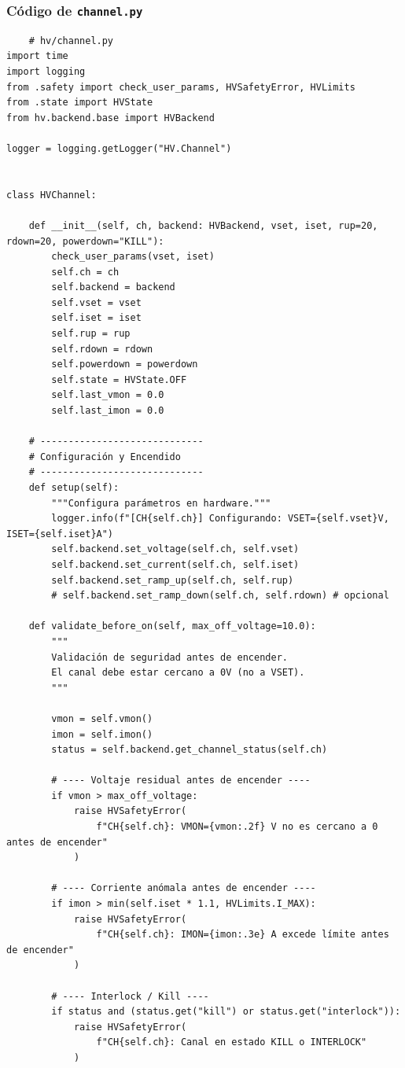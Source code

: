 \documentclass{article}
\begin{document}
\subsubsection{Código de \texttt{channel.py}}
\begin{lstlisting}
    # hv/channel.py
import time
import logging
from .safety import check_user_params, HVSafetyError, HVLimits
from .state import HVState
from hv.backend.base import HVBackend

logger = logging.getLogger("HV.Channel")


class HVChannel:

    def __init__(self, ch, backend: HVBackend, vset, iset, rup=20, rdown=20, powerdown="KILL"):
        check_user_params(vset, iset)
        self.ch = ch
        self.backend = backend
        self.vset = vset
        self.iset = iset
        self.rup = rup
        self.rdown = rdown
        self.powerdown = powerdown
        self.state = HVState.OFF
        self.last_vmon = 0.0
        self.last_imon = 0.0

    # -----------------------------
    # Configuración y Encendido
    # -----------------------------
    def setup(self):
        """Configura parámetros en hardware."""
        logger.info(f"[CH{self.ch}] Configurando: VSET={self.vset}V, ISET={self.iset}A")
        self.backend.set_voltage(self.ch, self.vset)
        self.backend.set_current(self.ch, self.iset)
        self.backend.set_ramp_up(self.ch, self.rup)
        # self.backend.set_ramp_down(self.ch, self.rdown) # opcional

    def validate_before_on(self, max_off_voltage=10.0):
        """
        Validación de seguridad antes de encender.
        El canal debe estar cercano a 0V (no a VSET).
        """

        vmon = self.vmon()
        imon = self.imon()
        status = self.backend.get_channel_status(self.ch)

        # ---- Voltaje residual antes de encender ----
        if vmon > max_off_voltage:
            raise HVSafetyError(
                f"CH{self.ch}: VMON={vmon:.2f} V no es cercano a 0 antes de encender"
            )

        # ---- Corriente anómala antes de encender ----
        if imon > min(self.iset * 1.1, HVLimits.I_MAX):
            raise HVSafetyError(
                f"CH{self.ch}: IMON={imon:.3e} A excede límite antes de encender"
            )

        # ---- Interlock / Kill ----
        if status and (status.get("kill") or status.get("interlock")):
            raise HVSafetyError(
                f"CH{self.ch}: Canal en estado KILL o INTERLOCK"
            )



\end{lstlisting}
\end{document}
